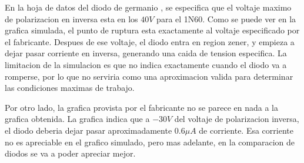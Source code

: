 \documentclass[chaptersright]{informeutn}
\begin{document}
        En la hoja de datos del diodo de germanio \cite{DS1}, se especifica que el voltaje maximo de polarizacion en
        inversa esta en los $40V$ para el 1N60. Como se puede ver en la grafica simulada, el punto de ruptura esta
        exactamente al voltaje especificado por el fabricante. Despues de ese voltaje, el diodo entra en region zener,
        y empieza a dejar pasar corriente en inversa, generando una caida de tension especifica. La limitacion de la
        simulacion es que no indica exactamente cuando el diodo va a romperse, por lo que no serviria como una
        aproximacion valida para determinar las condiciones maximas de trabajo.

        Por otro lado, la grafica provista por el fabricante no se parece en nada a la grafica obtenida. La grafica
        indica que a $-30V$ del voltaje de polarizacion inversa, el diodo deberia dejar pasar aproximadamente
        $0.6\mu A$ de corriente. Esa corriente no es apreciable en el grafico simulado, pero mas adelante, en la
        comparacion de diodos se va a poder apreciar mejor.
\end{document}
